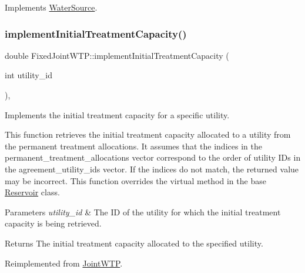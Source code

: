 Implements \mbox{\hyperlink{classWaterSource_ac070445379fe706f65b977dade4f3fbc}{Water\+Source}}.

\mbox{\label{classFixedJointWTP_a0874b64a650c002d7230bd95bc4817ef}} 
\subsubsection{\texorpdfstring{implement\+Initial\+Treatment\+Capacity()}{implementInitialTreatmentCapacity()}}
{\footnotesize\ttfamily double Fixed\+Joint\+W\+T\+P\+::implement\+Initial\+Treatment\+Capacity (\begin{DoxyParamCaption}\item[{int}]{utility\+\_\+id }\end{DoxyParamCaption})\hspace{0.3cm}{\ttfamily [override]}, {\ttfamily [virtual]}}



Implements the initial treatment capacity for a specific utility. 

This function retrieves the initial treatment capacity allocated to a utility from the permanent treatment allocations. It assumes that the indices in the {\ttfamily permanent\+\_\+treatment\+\_\+allocations} vector correspond to the order of utility I\+Ds in the {\ttfamily agreement\+\_\+utility\+\_\+ids} vector. If the indices do not match, the returned value may be incorrect. This function overrides the virtual method in the base {\ttfamily \mbox{\hyperlink{classReservoir}{Reservoir}}} class.


\begin{DoxyParams}{Parameters}
{\em utility\+\_\+id} & The ID of the utility for which the initial treatment capacity is being retrieved.\\
\hline
\end{DoxyParams}
\begin{DoxyReturn}{Returns}
The initial treatment capacity allocated to the specified utility. 
\end{DoxyReturn}


Reimplemented from \mbox{\hyperlink{classJointWTP_ae8a2a5c4d5173b43d30fc9c1169574f8}{Joint\+W\+TP}}.

\mbox{\label{classFixedJointWTP_ad8cade8e61f861485b025cb0afe28c1a}} 
